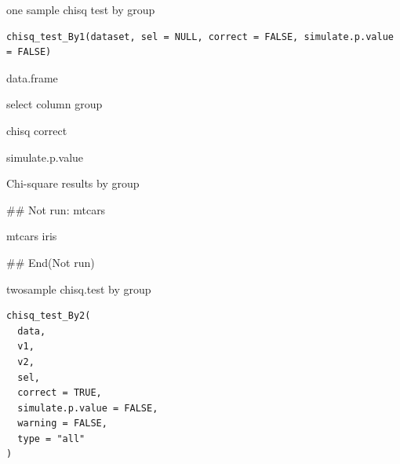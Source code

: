 \documentclass[a4paper]{book}
\begin{document}
%
\begin{Description}
one sample chisq test by group
\end{Description}
%
\begin{Usage}
\begin{verbatim}
chisq_test_By1(dataset, sel = NULL, correct = FALSE, simulate.p.value = FALSE)
\end{verbatim}
\end{Usage}
%
\begin{Arguments}
\begin{ldescription}
\item[\code{dataset}] data.frame

\item[\code{sel}] select column group

\item[\code{correct}] chisq correct

\item[\code{simulate.p.value}] simulate.p.value
\end{ldescription}
\end{Arguments}
%
\begin{Value}
Chi-square results by group
\end{Value}
%
\begin{Examples}
\begin{ExampleCode}
## Not run: 
mtcars%

mtcars%
iris%

## End(Not run)
\end{ExampleCode}
\end{Examples}
%
\begin{Description}
twosample chisq.test by group
\end{Description}
%
\begin{Usage}
\begin{verbatim}
chisq_test_By2(
  data,
  v1,
  v2,
  sel,
  correct = TRUE,
  simulate.p.value = FALSE,
  warning = FALSE,
  type = "all"
)
\end{verbatim}
\end{Usage}
%
\end{document}
